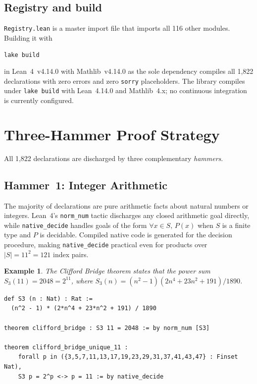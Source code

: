 \documentclass[11pt,a4paper]{article}
\newtheorem{example}[theorem]{Example}
\begin{document}
\subsection{Registry and build}

\texttt{Registry.lean} is a master import file that imports all 116 other
modules.  Building it with
\begin{center}
\texttt{lake build}
\end{center}
in Lean~4~v4.14.0 with Mathlib~v4.14.0 as the sole dependency compiles all
1,822 declarations with zero errors and zero \texttt{sorry} placeholders.
The library compiles under \texttt{lake build} with Lean~4.14.0 and
Mathlib~4.x; no continuous integration is currently configured.

\section{Three-Hammer Proof Strategy}
\label{sec:hammers}

All 1,822 declarations are discharged by three complementary
\emph{hammers}.

\subsection{Hammer~1: Integer Arithmetic}

The majority of declarations are pure arithmetic facts about natural
numbers or integers.  Lean~4's \texttt{norm\_num} tactic discharges
any closed arithmetic goal directly, while \texttt{native\_decide}
handles goals of the form $\forall x \in S,\, P(x)$ when $S$ is a
finite type and $P$ is decidable.  Compiled native code is generated
for the decision procedure, making \texttt{native\_decide} practical
even for products over $|S|=11^2=121$ index pairs.

\begin{example}
The Clifford Bridge theorem states that the power sum
$S_3(11) = 2048 = 2^{11}$, where
$S_3(n) = (n^2-1)(2n^4+23n^2+191)/1890$.
\begin{lstlisting}
def S3 (n : Nat) : Rat :=
  (n^2 - 1) * (2*n^4 + 23*n^2 + 191) / 1890

theorem clifford_bridge : S3 11 = 2048 := by norm_num [S3]

theorem clifford_bridge_unique_11 :
    forall p in ({3,5,7,11,13,17,19,23,29,31,37,41,43,47} : Finset Nat),
    S3 p = 2^p <-> p = 11 := by native_decide
\end{lstlisting}
\end{example}
\end{document}
